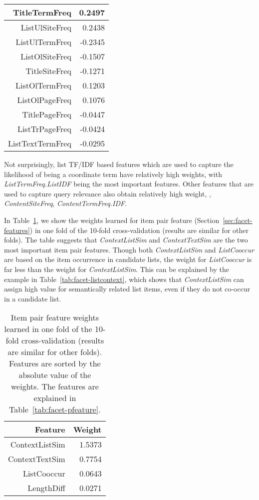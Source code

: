 \begin{table}[!ht]
\begin{tabular}{|r|r|}
TitleTermFreq & 0.2497 \\ \hline
ListUlSiteFreq & 0.2438 \\ \hline
ListUlTermFreq & -0.2345 \\ \hline
ListOlSiteFreq & -0.1507 \\ \hline
TitleSiteFreq & -0.1271 \\ \hline
ListOlTermFreq & 0.1203 \\ \hline
ListOlPageFreq & 0.1076 \\ \hline
TitlePageFreq & -0.0447 \\ \hline
ListTrPageFreq & -0.0424 \\ \hline
ListTextTermFreq & -0.0295 \\ \hline
\end{tabular}
\end{table}
Not surprisingly, list TF/IDF based features which are used to capture the likelihood of being a coordinate term have relatively high weights, with \textit{ListTermFreq.ListIDF} being the most important features. Other features that are used to capture query relevance also obtain relatively high weight, \eg, \textit{ContentSiteFreq}, \textit{ContentTermFreq.IDF}. 


In Table~\ref{tab:intrinsic-panalysis}, we show the weights learned for item pair feature (Section~\ref{sec:facet-features}) in one fold of the 10-fold cross-validation (results are similar for other folds). The table suggests that \textit{ContextListSim} and \textit{ContextTextSim} are the two most important item pair features. Though both \textit{ContextListSim} and \textit{ListCooccur} are based on the item occurrence in candidate lists, the weight for \textit{ListCooccur} is far less than the weight for \textit{ContextListSim}. This can be explained by the example in Table~\ref{tab:facet-listcontext}, which shows that \textit{ContextListSim} can assign high value for semantically related list items, even if they do not co-occur in a candidate list.
\begin{table}[!ht]
\centering
\caption{Item pair feature weights learned in one fold of the 10-fold cross-validation (results are similar for other folds). Features are sorted by the absolute value of the weights. The features are explained in Table~\ref{tab:facet-pfeature}.}
\label{tab:intrinsic-panalysis}
\begin{tabular}{|r|r|} \hline
Feature & Weight \\ \hline
ContextListSim & 1.5373 \\ \hline
ContextTextSim & 0.7754 \\ \hline
ListCooccur & 0.0643 \\ \hline
LengthDiff & 0.0271 \\ \hline
\end{tabular}
\end{table}

